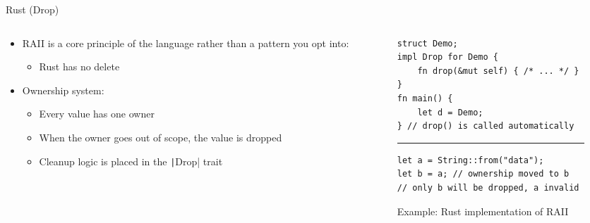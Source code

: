 \begin{frame}[fragile]{Rust (Drop)}
	\begin{columns}[T,onlytextwidth]
		\begin{column}{0.45\textwidth}
			\begin{itemize}
				\item RAII is a core principle of the language rather than a pattern you opt into:
				      \begin{itemize}
					      \item Rust has no delete
				      \end{itemize}
				\item Ownership system:
				      \begin{itemize}
					      \item Every value has one owner
					      \item When the owner goes out of scope, the value is dropped
					      \item Cleanup logic is placed in the \texttt|Drop| trait
				      \end{itemize}
			\end{itemize}
		\end{column}
		\begin{column}{0.5\textwidth}
			\begin{figure}
				\centering
				\begin{verbatim}
struct Demo;
impl Drop for Demo {
    fn drop(&mut self) { /* ... */ }
}
fn main() {
    let d = Demo;
} // drop() is called automatically
                \end{verbatim}
				\rule{\linewidth}{0.5mm}
				\begin{verbatim}
let a = String::from("data");
let b = a; // ownership moved to b
// only b will be dropped, a invalid
                \end{verbatim}
				\caption{Example: Rust implementation of RAII}
			\end{figure}
		\end{column}
	\end{columns}
\end{frame}

